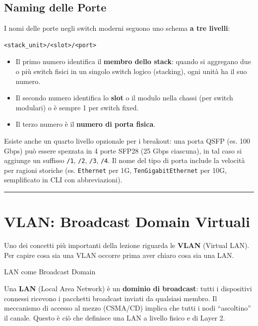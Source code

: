 \documentclass[
  italian,
  openany]{book}
\providecommand{\tightlist}{%
  \setlength{\itemsep}{0pt}\setlength{\parskip}{0pt}}
\begin{document}
\subsection{Naming delle Porte}\label{naming-delle-porte}

I nomi delle porte negli switch moderni seguono uno schema \textbf{a tre
livelli}:

\begin{verbatim}
<stack_unit>/<slot>/<port>
\end{verbatim}

\begin{itemize}
\tightlist
\item
  Il primo numero identifica il \textbf{membro dello stack}: quando si
  aggregano due o più switch fisici in un singolo switch logico
  (stacking), ogni unità ha il suo numero.
\item
  Il secondo numero identifica lo \textbf{slot} o il modulo nella chassi
  (per switch modulari) o è sempre 1 per switch fixed.
\item
  Il terzo numero è il \textbf{numero di porta fisica}.
\end{itemize}

Esiste anche un quarto livello opzionale per i breakout: una porta QSFP
(es. 100 Gbps) può essere spezzata in 4 porte SFP28 (25 Gbps ciascuna),
in tal caso si aggiunge un suffisso \texttt{/1}, \texttt{/2},
\texttt{/3}, \texttt{/4}. Il nome del tipo di porta include la velocità
per ragioni storiche (es. \texttt{Ethernet} per 1G,
\texttt{TenGigabitEthernet} per 10G, semplificato in CLI con
abbreviazioni).

\begin{center}\rule{0.5\linewidth}{0.5pt}\end{center}

\section{VLAN: Broadcast Domain
Virtuali}\label{vlan-broadcast-domain-virtuali}

Uno dei concetti più importanti della lezione riguarda le \textbf{VLAN}
(Virtual LAN). Per capire cosa sia una VLAN occorre prima aver chiaro
cosa sia una LAN.

\begin{calloutdefinition}{LAN come Broadcast Domain}

Una \textbf{LAN} (Local Area Network) è un \textbf{dominio di
broadcast}: tutti i dispositivi connessi ricevono i pacchetti broadcast
inviati da qualsiasi membro. Il meccanismo di accesso al mezzo (CSMA/CD)
implica che tutti i nodi ``ascoltino'' il canale. Questo è ciò che
definisce una LAN a livello fisico e di Layer 2.

\end{calloutdefinition}
\end{document}
